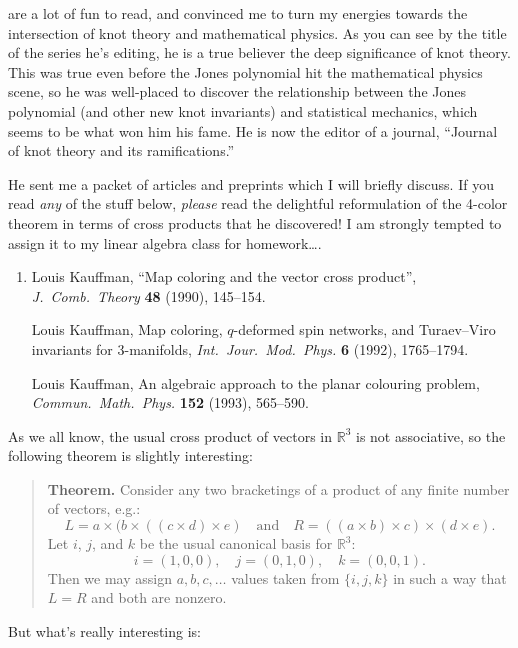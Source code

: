 \documentclass[12pt]{article}
\begin{document}
are a lot of fun to read, and convinced me to turn my energies towards
the intersection of knot theory and mathematical physics. As you can see
by the title of the series he's editing, he is a true believer the deep
significance of knot theory. This was true even before the Jones
polynomial hit the mathematical physics scene, so he was well-placed to
discover the relationship between the Jones polynomial (and other new
knot invariants) and statistical mechanics, which seems to be what won
him his fame. He is now the editor of a journal, ``Journal of knot
theory and its ramifications.''

He sent me a packet of articles and preprints which I will briefly
discuss. If you read \emph{any} of the stuff below, \emph{please} read
the delightful reformulation of the 4-color theorem in terms of cross
products that he discovered! I am strongly tempted to assign it to my
linear algebra class for homework\ldots.

\begin{enumerate}
\def\labelenumi{\arabic{enumi})}
\setcounter{enumi}{2}
\item
   Louis Kauffman, ``Map coloring and the vector cross product'',
  \emph{J.\ Comb.\ Theory} \textbf{48} (1990), 145--154.

   Louis Kauffman, Map coloring, $q$-deformed spin networks, and Turaev--Viro invariants
  for 3-manifolds, \emph{Int.\ Jour.\  Mod.\ Phys.}
  \textbf{6} (1992), 1765--1794.

   Louis Kauffman, An algebraic approach to the planar colouring problem, 
   \emph{Commun.\ Math.\ Phys.} \textbf{152} (1993), 565--590.
\end{enumerate}

As we all know, the usual cross product of vectors in \(\mathbb{R}^3\)
is not associative, so the following theorem is slightly interesting:

\begin{quote}
{\rm 
\textbf{Theorem.} Consider any two bracketings of a product of any
finite number of vectors, e.g.:
\[L = a \times (b \times ((c \times d) \times e) \quad\text{and}\quad  R = ((a \times b) \times c) \times (d \times e).\]
Let \(i\), \(j\), and \(k\) be the usual canonical basis for
\(\mathbb{R}^3\): \[i = (1,0,0), \quad j = (0,1,0), \quad k = (0,0,1).\]
Then we may assign \(a,b,c,\ldots\) values taken from \(\{i,j,k\}\) in
such a way that \(L = R\) and both are nonzero.
} 
\end{quote}

But what's really interesting is:
\end{document}
